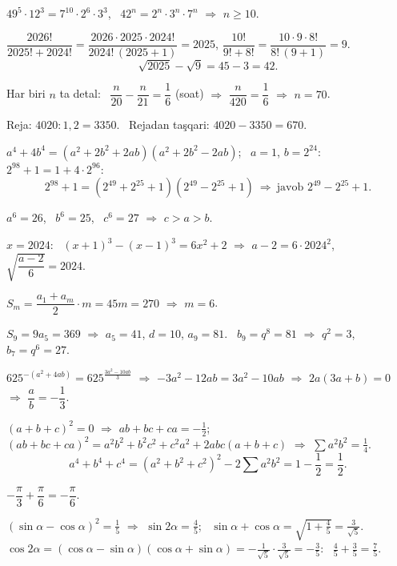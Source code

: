 




$49^5\cdot12^3=7^{10}\cdot2^6\cdot3^3$, \ $42^n=2^n\cdot3^n\cdot7^n$ $\Rightarrow$ $n\ge10$.

$\dfrac{2026!}{2025!+2024!}=\dfrac{2026\cdot2025\cdot2024!}{2024!\,(2025+1)}=2025$, \quad $\dfrac{10!}{9!+8!}=\dfrac{10\cdot9\cdot8!}{8!\,(9+1)}=9$.
\[\sqrt{2025}-\sqrt9=45-3=42.\]

Har biri $n$ ta detal: \ $\dfrac n{20}-\dfrac n{21}=\dfrac16$ (soat) $\Rightarrow$ $\dfrac n{420}=\dfrac16$ $\Rightarrow$ $n=70$.

Reja: $4020:1{,}2=3350$. \ Rejadan taşqari: $4020-3350=670$.

$a^4+4b^4=\left(a^2+2b^2+2ab\right)\left(a^2+2b^2-2ab\right)$; \ $a=1$, $b=2^{24}$: \ $2^{98}+1=1+4\cdot2^{96}$:
\[2^{98}+1=\left(2^{49}+2^{25}+1\right)\left(2^{49}-2^{25}+1\right)\ \Rightarrow\ \text{javob }2^{49}-2^{25}+1.\]

$a^6=26$, \ $b^6=25$, \ $c^6=27$ $\Rightarrow$ $c>a>b$.

$x=2024$: \ $(x+1)^3-(x-1)^3=6x^2+2$ $\Rightarrow$ $a-2=6\cdot2024^2$, \ $\sqrt{\dfrac{a-2}6}=2024$.

$S_m=\dfrac{a_1+a_m}2\cdot m=45m=270$ $\Rightarrow$ $m=6$.

$S_9=9a_5=369$ $\Rightarrow$ $a_5=41$, $d=10$, $a_9=81$. \ $b_9=q^8=81$ $\Rightarrow$ $q^2=3$, \ $b_7=q^6=27$.

$625^{-(a^2+4ab)}=625^{\frac{3a^2-10ab}3}$ $\Rightarrow$ $-3a^2-12ab=3a^2-10ab$ $\Rightarrow$ $2a(3a+b)=0$ $\Rightarrow$ $\dfrac ab=-\dfrac13$.

$(a+b+c)^2=0$ $\Rightarrow$ $ab+bc+ca=-\frac12$; \ $(ab+bc+ca)^2=a^2b^2+b^2c^2+c^2a^2+2abc(a+b+c)$ $\Rightarrow$ $\sum a^2b^2=\frac14$.
\[a^4+b^4+c^4=\left(a^2+b^2+c^2\right)^2-2\sum a^2b^2=1-\frac12=\frac12.\]

$-\dfrac\pi3+\dfrac\pi6=-\dfrac\pi6$.

$(\sin\alpha-\cos\alpha)^2=\frac15$ $\Rightarrow$ $\sin2\alpha=\frac45$; \ $\sin\alpha+\cos\alpha=\sqrt{1+\frac45}=\frac3{\sqrt5}$.\\
$\cos2\alpha=(\cos\alpha-\sin\alpha)(\cos\alpha+\sin\alpha)=-\frac1{\sqrt5}\cdot\frac3{\sqrt5}=-\frac35$: \ $\frac45+\frac35=\frac75$.

